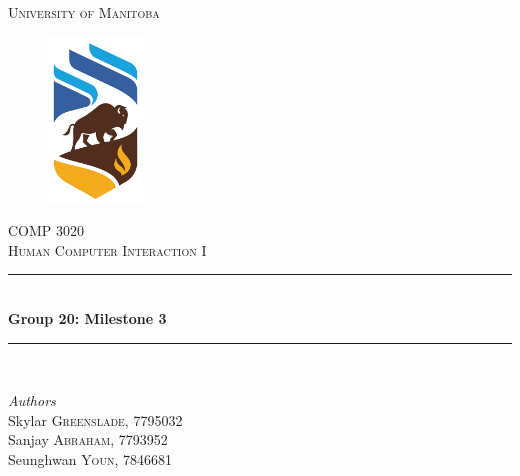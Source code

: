 \documentclass{article}
\begin{document}
\begin{titlepage} %
	\newcommand{\HRule}{\rule{\linewidth}{0.5mm}} %
	
	\center %
	
	
	\textsc{\LARGE University of Manitoba}\\[1.5cm] %
	
	\begin{figure}
	    \centering
	    \includegraphics[width=1in]{uofmlogo.png}
	    \label{fig:uofm}
	\end{figure}
	
	\textsc{\Large COMP 3020}\\[0.5cm] %
	
	\textsc{\large Human Computer Interaction I}\\[0.5cm] %
	
	
	\HRule\\[0.4cm]
	
	{\huge\bfseries Group 20: Milestone 3}\\[0.4cm] %
	
	\HRule\\[1.5cm]
	
	
	\begin{minipage}{0.4\textwidth}
		\begin{flushleft}
			\large
			\textit{Authors}\\
			Skylar \textsc{Greenslade}, 7795032\\
			Sanjay \textsc{Abraham}, 7793952\\
			Seunghwan \textsc{Youn}, 7846681
			

\end{flushleft}
\end{minipage}
\end{titlepage}
\end{document}
